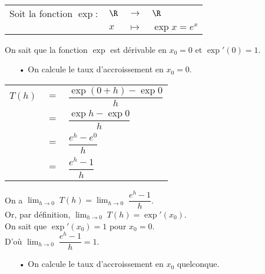 \begin{tabular}{llll}
\hspace*{-.3cm} Soit la fonction $\exp :$ & $\R$ & $\longrightarrow$ & $\R$ \\
& $x$ & $\longmapsto$ & $\exp x = e^x$ \\
\end{tabular}

\vspace*{.3cm}

On sait que la fonction $\exp$ est dérivable en $x_0 = 0$ et $\exp'(0) = 1$. \\

\begin{itemize}
\item[•] On calcule le taux d'accroissement en $x_0 = 0$. \\
\end{itemize}

\begin{tabular}{lll}
$T(h)$ & $=$ & $\dfrac{\exp\left(0 + h\right) - \exp 0}{h}$ \vspace*{.3cm} \\
& $=$ & $\dfrac{\exp h - \exp 0}{h}$ \vspace*{.3cm} \\
& $=$ & $\dfrac{e^h - e^0}{h}$ \vspace*{.3cm} \\
& $=$ & $\dfrac{e^h - 1}{h}$ \\
\end{tabular}

\vspace*{.3cm}

On a $ \displaystyle {\lim_{h \rightarrow 0}} \; T(h) = \displaystyle {\lim_{h \rightarrow 0}} \; \dfrac{e^h - 1}{h}$. \\

Or, par définition, $ \displaystyle {\lim_{h \rightarrow 0}} \; T(h) = \exp'\left(x_0\right)$. \\

On sait que $\exp'\left(x_0\right) = 1$ pour $x_0 = 0$. \\

D'où $\displaystyle {\lim_{h \rightarrow 0}} \; \dfrac{e^h - 1}{h} = 1$. \\

\begin{itemize}
\item[•] On calcule le taux d'accroissement en $x_0$ quelconque. \\
\end{itemize}

